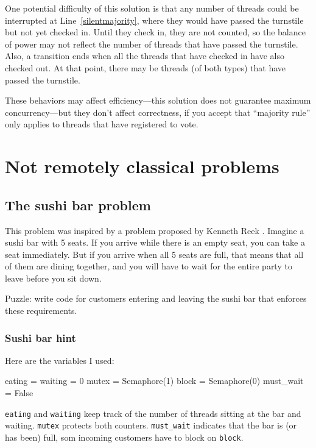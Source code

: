 \documentclass{book}
\begin{document}
One potential difficulty of this solution is that any number
of threads could be interrupted at Line~\ref{silentmajority},
where they would have passed the turnstile but not yet checked in.
Until they check in, they are not counted, so the balance of
power may not reflect the number of threads that have passed the
turnstile.  Also, a transition ends when all the threads that have
checked in have also checked out.  At that point, there may
be threads (of both types) that have passed the turnstile.

These behaviors may affect efficiency---this solution does
not guarantee maximum concurrency---but they don't affect
correctness, if you accept that ``majority rule'' only applies
to threads that have registered to vote.



\chapter{Not remotely classical problems}


% 
\section{The sushi bar problem}

This problem was inspired by a problem proposed by Kenneth Reek \cite{reek}.
Imagine a sushi bar with 5 seats.  If you arrive while there is an
empty seat, you can take a seat immediately.  But if you arrive when
all 5 seats are full, that means that all of them are dining together,
and you will have to wait for the entire party to leave before you
sit down.

Puzzle: write code for customers entering and
leaving the sushi bar that enforces these requirements.


\subsection {Sushi bar hint}

Here are the variables I used:

\begin{unbreakable}[title={Sushi bar hint}]{}
eating = waiting = 0
mutex = Semaphore(1)
block = Semaphore(0)
must_wait = False
\end{unbreakable}

{\tt eating} and {\tt waiting} keep track of the number of
threads sitting at the bar and waiting.  {\tt mutex} protects
both counters.  {\tt must\_wait} indicates that the bar is (or
has been) full, som incoming customers have to block
on {\tt block}.
\end{document}
